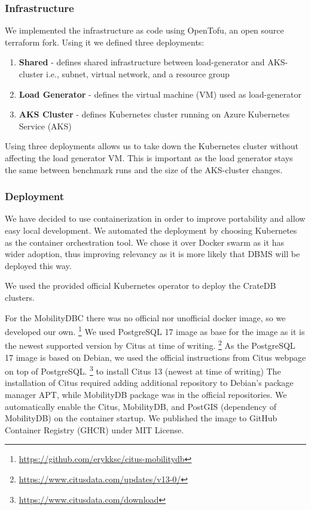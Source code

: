 \subsubsection{Infrastructure}
We implemented the infrastructure as code using OpenTofu, an open source terraform fork.
Using it we defined three deployments:
\begin{enumerate}
	\item \textbf{Shared} - defines shared infrastructure between load-generator and AKS-cluster i.e., subnet, virtual network, and a resource group
	\item \textbf{Load Generator} - defines the virtual machine (VM) used as load-generator
	\item \textbf{AKS Cluster} - defines Kubernetes cluster running on Azure Kubernetes Service (AKS)
\end{enumerate}

Using three deployments allows us to take down the Kubernetes cluster without affecting the load generator VM.
This is important as the load generator stays the same between benchmark runs and the size of the AKS-cluster changes.

\subsubsection{Deployment}

We have decided to use containerization in order to improve portability and allow easy local development.
We automated the deployment by choosing Kubernetes as the container orchestration tool.
We chose it over Docker swarm as it has wider adoption, thus improving relevancy as it is more likely that DBMS will be deployed this way.

We used the provided official Kubernetes operator to deploy the CrateDB clusters.

For the MobilityDBC there was no official nor unofficial docker image, so we developed our own.
\footnote{\url{https://github.com/erykksc/citus-mobilitydb}}
We used PostgreSQL 17 image as base for the image as it is the newest supported version by Citus at time of writing.
\footnote{\url{https://www.citusdata.com/updates/v13-0/}}
As the PostgreSQL 17 image is based on Debian, we used the official instructions from Citus webpage on top of PostgreSQL.
\footnote{\url{https://www.citusdata.com/download}} to install Citus 13 (newest at time of writing)
The installation of Citus required adding additional repository to Debian's package manager APT, while MobilityDB package was in the official repositories.
We automatically enable the Citus, MobilityDB, and PostGIS (dependency of MobilityDB) on the container startup.
We published the image to GitHub Container Registry (GHCR) under MIT License.

